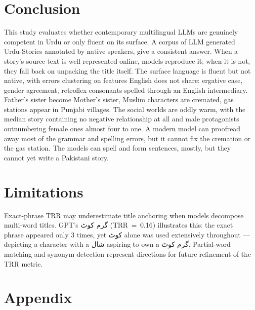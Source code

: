 \documentclass[11pt]{article}
\begin{document}
\section{Conclusion}

This study evaluates whether contemporary multilingual LLMs are
genuinely competent in Urdu or only fluent on its
surface. A corpus of LLM generated Urdu-Stories  annotated by
native speakers, give a consistent answer. When a
story's source text is well represented online, models
reproduce it; when it is not, they fall back on
unpacking the title itself. 
The surface language is fluent but not native, with
errors clustering on features English does not share:
ergative case, gender agreement, retroflex consonants
spelled through an English intermediary. Father's sister
become Mother's sister, Muslim characters are cremated,
gas stations appear in Punjabi villages. The social
worlds are oddly warm, with the median story containing
no negative relationship at all and male protagonists
outnumbering female ones almost four to one. A modern
model can proofread away most of the grammar and
spelling errors, but it cannot fix the cremation or the
gas station. The models can spell and form sentences,
mostly, but they cannot yet write a Pakistani story.
\section*{Limitations}
\label{subsec:trr_limit}

Exact-phrase TRR may underestimate title anchoring when 
models decompose multi-word titles. GPT's \foreignlanguage{arabic}{گرم کوٹ} 
(TRR~=~0.16) illustrates this: the exact phrase appeared 
only 3 times, yet \foreignlanguage{arabic}{کوٹ} alone was used extensively 
throughout --- depicting a character with a \foreignlanguage{arabic}{شال} 
aspiring to own a \foreignlanguage{arabic}{گرم کوٹ}. Partial-word matching 
and synonym detection represent directions for future 
refinement of the TRR metric.




\appendix

\section{Appendix}
\end{document}

